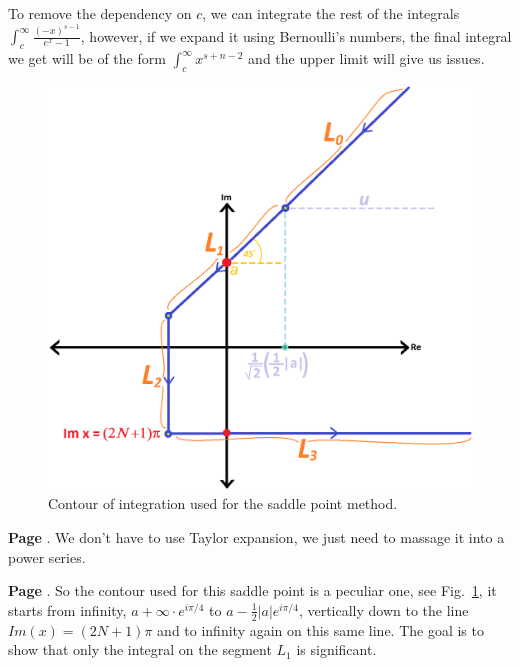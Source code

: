 \documentclass[aps,preprint,preprintnumbers,nofootinbib,showpacs,prd]{revtex4-1}
\begin{document}
To remove the dependency on $c$, we can integrate the rest of the integrals $\int_c^\infty \frac{(-x)^{s-1}}{e^x - 1}$, however, if we expand it using Bernoulli's numbers, the final integral we get will be of the form $\int_c^\infty x^{s + n -2}$ and the upper limit will give us issues.






%
\begin{figure}
\centering
  \includegraphics[width=1.00\linewidth]{Saddle_Point_Contour.png}
  \caption{Contour of integration used for the saddle point method.}
\label{fig:Saddle_Point_Contour}
\end{figure}
%





{\bf Page }. We don't have to use Taylor expansion, we just need to massage it into a power series.













{\bf Page }. So the contour used for this saddle point is a peculiar one, see Fig.~\ref{fig:Saddle_Point_Contour}, it starts from infinity, $a + \infty\cdot e^{i\pi/4}$ to $a - \frac{1}{2}|a|e^{i\pi/4}$, vertically down to the line $Im(x) = (2N+1)\pi$ and to infinity again on this same line. The goal is to show that only the integral on the segment $L_1$ is significant.
\end{document}

